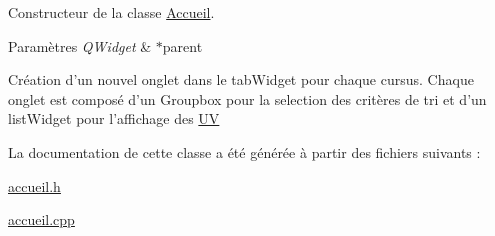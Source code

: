 Constructeur de la classe \hyperlink{class_accueil}{Accueil}. 


\begin{DoxyParams}{Paramètres}
{\em Q\+Widget} & $\ast$parent \\
\hline
\end{DoxyParams}
Création d'un nouvel onglet dans le tab\+Widget pour chaque cursus. Chaque onglet est composé d'un Groupbox pour la selection des critères de tri et d'un list\+Widget pour l'affichage des \hyperlink{class_u_v}{U\+V}

La documentation de cette classe a été générée à partir des fichiers suivants \+:\begin{DoxyCompactItemize}
\item 
\hyperlink{accueil_8h}{accueil.\+h}\item 
\hyperlink{accueil_8cpp}{accueil.\+cpp}\end{DoxyCompactItemize}

